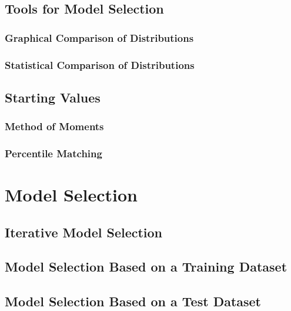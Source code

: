 \documentclass[]{book}
\theoremstyle{definition}
\theoremstyle{definition}
\theoremstyle{definition}
\theoremstyle{remark}
\begin{document}
\subsection{Tools for Model Selection}\label{S:MS:ToolsModelSelection}

\subsubsection{Graphical Comparison of
Distributions}\label{graphical-comparison-of-distributions}

\subsubsection{Statistical Comparison of
Distributions}\label{S:MS:Tools:Stats}

\subsection{Starting Values}\label{starting-values}

\subsubsection{Method of Moments}\label{method-of-moments}

\subsubsection{Percentile Matching}\label{percentile-matching}

\section{Model Selection}\label{S:MS:ModelSelection}

\subsection{Iterative Model Selection}\label{iterative-model-selection}

\subsection{Model Selection Based on a Training
Dataset}\label{model-selection-based-on-a-training-dataset}

\subsection{Model Selection Based on a Test
Dataset}\label{model-selection-based-on-a-test-dataset}
\end{document}
